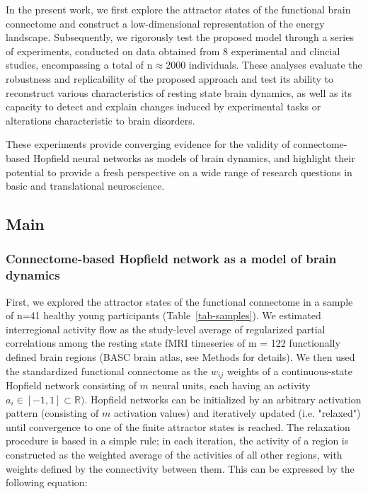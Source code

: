 \documentclass{article}
\begin{document}
In the present work, we first explore the attractor states of the functional brain connectome and construct a
low-dimensional representation of the energy landscape.
Subsequently, we rigorously test the proposed model through a series of experiments, conducted on data obtained
from 8 experimental and clincial studies, encompassing a total of n$\approx$2000 individuals.
These analyses evaluate the robustness and replicability of the proposed approach and test its ability to reconstruct
various characteristics of resting state brain dynamics, as well as its capacity to detect and explain changes induced
by experimental tasks or alterations characteristic to brain disorders.

These experiments provide converging evidence for the validity of connectome-based Hopfield neural networks as models
of brain dynamics, and highlight their potential to provide a fresh perspective on a wide range of research questions
in basic and translational neuroscience.

\subsection{Main}\label{Main}

\subsubsection{Connectome-based Hopfield network as a model of brain dynamics}\label{Connectome-based Hopfield network as a model of brain dynamics}

First, we explored the attractor states of the functional connectome in a sample of n=41 healthy young
participants (Table~\ref{tab-samples}). We estimated interregional activity flow \citep{cole2016activity, ito2017cognitive}
as the study-level average of regularized partial correlations among the resting state fMRI timeseries of m = 122
functionally defined brain regions (BASC brain atlas, see Methods for details). We then used the standardized
functional connectome as the $w_{ij}$  weights of a continuous-state Hopfield network
\citep{hopfield1982neural, koiran1994dynamics} consisting of $m$ neural units, each having an activity
$a_i \in [ -1,1] \subset \mathbb{R})$. Hopfield networks can be initialized by an arbitrary activation pattern (consisting of
$m$ activation values) and iteratively updated (i.e. "relaxed") until convergence to one of the finite attractor states is reached. The relaxation procedure is based in a simple rule; in each iteration, the activity of a region is constructed as the weighted average of the activities of all other regions, with weights defined by the connectivity between them.
This can be expressed by the following equation:
\end{document}
